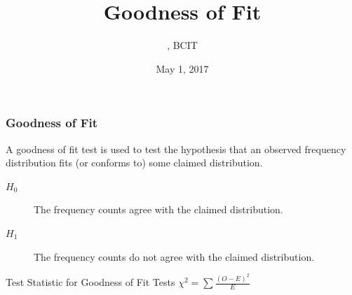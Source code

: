 \documentclass[xcolor=dvipsnames]{beamer}
\title{Goodness of Fit}
\subtitle{{\CourseNumber}, BCIT}
\author{\CourseName}
\date{May 1, 2017}
\begin{document}
\begin{frame}
  \titlepage
\end{frame}

\begin{frame}
  \frametitle{Goodness of Fit}
  A \alert{goodness of fit} test is used to test the hypothesis
  that an observed frequency distribution fits (or conforms to)
  some claimed distribution.

  \begin{description}
  \item[$H_{0}$] The frequency counts agree with the claimed
    distribution.
  \item[$H_{1}$]  The frequency counts do not agree with the claimed
    distribution.
  \end{description}

  \bigskip

  \begin{block}{Test Statistic for Goodness of Fit Tests}
    $\displaystyle \chi^{2}=\sum\frac{(O-E)^{2}}{E}$
  \end{block}
\end{frame}
\end{document}
